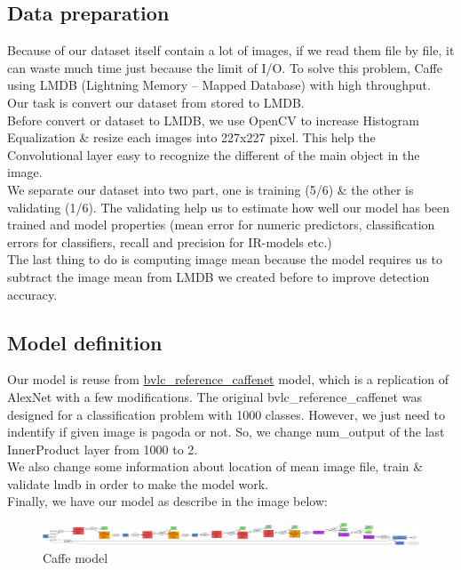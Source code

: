 \documentclass[12pt,a4paper]{article}
\begin{document}
\subsection{Data preparation}
Because of our dataset itself contain a lot of images, if we read them file by file, it can waste much time just because the limit of I/O. To solve this problem, Caffe using LMDB (Lightning Memory – Mapped Database) with high throughput. Our task is convert our dataset from stored to LMDB.\\

Before convert or dataset to LMDB, we use OpenCV to increase Histogram Equalization \& resize each images into 227x227 pixel. This help the Convolutional layer easy to recognize the different of the main object in the image.\\

We separate our dataset into two part, one is training (5/6) \& the other is validating (1/6). The validating help us to estimate how well our model has been trained and model properties (mean error for numeric predictors, classification errors for classifiers, recall and precision for IR-models etc.)\\

The last thing to do is computing image mean because the model requires us to subtract the image mean from LMDB we created before to improve detection accuracy.
\subsection{Model definition}
Our model is reuse from \href{https://github.com/BVLC/caffe/tree/master/models/bvlc\_reference\_caffenet}{bvlc\_reference\_caffenet} model, which is a replication of AlexNet with a few modifications.
The original bvlc\_reference\_caffenet was designed for a classification problem with 1000 classes. However, we just need to indentify if given image is pagoda or not. So, we change num\_output of the last InnerProduct layer from 1000 to 2.\\
We also change some information about location of mean image file, train \& validate lmdb in order to make the model work.\\
Finally, we have our model as describe in the image below:

\begin{figure}[H]
\centering
\includegraphics[width=\textwidth]{images/caffe_model.png}
\caption{Caffe model}
\end{figure}
\end{document}
